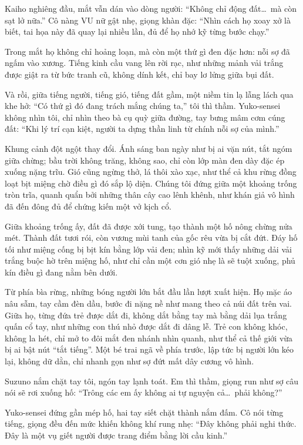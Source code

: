 \documentclass[../main.tex]{subfiles}
\begin{document}
Kaiho nghiêng đầu, mắt vẫn dán vào dòng người: ``Không chỉ động đất\dots\ mà còn sạt lở nữa.'' Cô nàng VU nữ gật nhẹ, giọng khàn đặc: ``Nhìn cách họ xoay xở là biết, tai họa này đã quay lại nhiều lần, đủ để họ nhớ kỹ từng bước chạy.''

Trong mắt họ không chỉ hoảng loạn, mà còn một thứ gì đen đặc hơn: nỗi sợ đã ngấm vào xương. Tiếng kinh cầu vang lên rời rạc, như những mảnh vải trắng được giật ra từ bức tranh cũ, không dính kết, chỉ bay lơ lửng giữa bụi đất.

Và rồi, giữa tiếng người, tiếng gió, tiếng đất gầm, một niềm tin lạ lẫng lách qua khe hở: ``Có thứ gì đó đang trách mắng chúng ta,'' tôi thì thầm. Yuko-sensei không nhìn tôi, chỉ nhìn theo bà cụ quỳ giữa đường, tay bưng mâm cơm cúng đất: ``Khi lý trí cạn kiệt, người ta dựng thần linh từ chính nỗi sợ của mình.''

Khung cảnh đột ngột thay đổi. Ánh sáng ban ngày như bị ai vặn nút, tắt ngóm giữa chừng; bầu trời không trăng, không sao, chỉ còn lớp màn đen dày đặc ép xuống nặng trĩu. Gió cũng ngừng thở, lá thôi xào xạc, như thể cả khu rừng đồng loạt bịt miệng chờ điều gì đó sắp lộ diện. Chúng tôi đứng giữa một khoảng trống tròn trĩa, quanh quẩn bởi những thân cây cao lênh khênh, như khán giả vô hình đã đến đông đủ để chứng kiến một vở kịch cổ.

Giữa khoảng trống ấy, đất đã được xới tung, tạo thành một hố nông chừng nửa mét. Thành đất tươi rói, còn vương mùi tanh của gốc rêu vừa bị cắt đứt. Đáy hố tối như miệng cống bị bịt kín bằng lớp vải đen; nhìn kỹ mới thấy những dải vải trắng buộc hờ trên miệng hố, như chỉ cần một cơn gió nhẹ là sẽ tuột xuống, phủ kín điều gì đang nằm bên dưới.

Từ phía bìa rừng, những bóng người lớn bắt đầu lần lượt xuất hiện. Họ mặc áo nâu sẫm, tay cầm đèn dầu, bước đi nặng nề như mang theo cả núi đất trên vai. Giữa họ, từng đứa trẻ được dắt đi, không dắt bằng tay mà bằng dải lụa trắng quấn cổ tay, như những con thú nhỏ được dắt đi dâng lễ. Trẻ con không khóc, không la hét, chỉ mở to đôi mắt đen nhánh nhìn quanh, như thể cả thế giới vừa bị ai bật nút ``tắt tiếng''. Một bé trai ngã về phía trước, lập tức bị người lớn kéo lại, không dữ dằn, chỉ nhanh gọn như sợ đứt mất dây cương vô hình.

Suzuno nắm chặt tay tôi, ngón tay lạnh toát. Em thì thầm, giọng run như sợ câu nói sẽ rơi xuống hố: ``Trông các em ấy không ai tự nguyện cả\dots\ phải không?''

Yuko-sensei đứng gần mép hố, hai tay siết chặt thành nắm đấm. Cô nói từng tiếng, giọng đều đến mức khiến không khí rung nhẹ: ``Đây không phải nghi thức. Đây là một vụ giết người được trang điểm bằng lời cầu kinh.''
\end{document}
